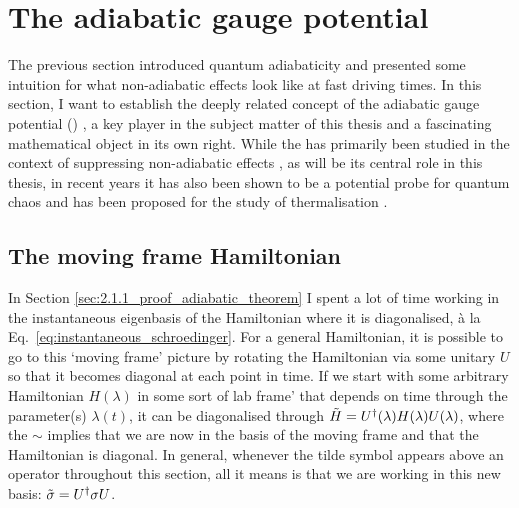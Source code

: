     \section{The adiabatic gauge potential}\label{sec:2.2_AGP}

    The previous section introduced quantum adiabaticity and presented some intuition for what non-adiabatic effects look like at fast driving times. In this section, I want to establish the deeply related concept of the adiabatic gauge potential () \cite{kolodrubetz_geometry_2017}, a key player in the subject matter of this thesis and a fascinating mathematical object in its own right. While the  has primarily been studied in the context of suppressing non-adiabatic effects \cite{sels_minimizing_2017, claeys_floquet-engineering_2019}, as will be its central role in this thesis, in recent years it has also been shown to be a potential probe for quantum chaos \cite{pandey_adiabatic_2020} and has been proposed for the study of thermalisation \cite{nandy_delayed_2022}. 

    \subsection{The moving frame Hamiltonian}

    In Section \ref{sec:2.1.1_proof_adiabatic_theorem} I spent a lot of time working in the instantaneous eigenbasis of the Hamiltonian where it is diagonalised, à la Eq.~\eqref{eq:instantaneous_schroedinger}. For a general Hamiltonian, it is possible to go to this `moving frame' picture by rotating the Hamiltonian via some unitary $U$ so that it becomes diagonal at each point in time. If we start with some arbitrary Hamiltonian $H(\lambda)$ in some sort of lab frame' that depends on time through the parameter(s) $\lambda(t)$, it can be diagonalised through $\Tilde{H} = U^{\dagger}(\lambda)H(\lambda)U(\lambda)$, where the $\sim$ implies that we are now in the basis of the moving frame and that the Hamiltonian is diagonal. In general, whenever the tilde symbol appears above an operator throughout this section, all it means is that we are working in this new basis: $\Tilde{\sigma} = U^{\dagger}\sigma U$.

